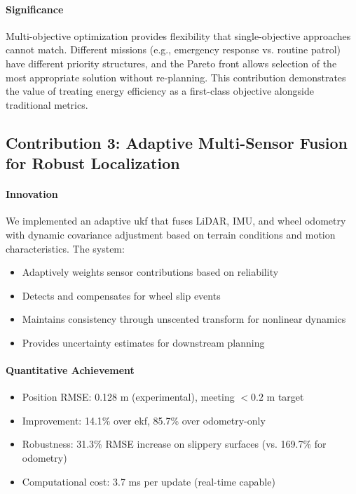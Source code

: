 \paragraph{Significance}
Multi-objective optimization provides flexibility that single-objective approaches cannot match. Different missions (e.g., emergency response vs. routine patrol) have different priority structures, and the Pareto front allows selection of the most appropriate solution without re-planning. This contribution demonstrates the value of treating energy efficiency as a first-class objective alongside traditional metrics.

\subsection{Contribution 3: Adaptive Multi-Sensor Fusion for Robust Localization}

\paragraph{Innovation}
We implemented an adaptive \acrshort{ukf} that fuses LiDAR, IMU, and wheel odometry with dynamic covariance adjustment based on terrain conditions and motion characteristics. The system:
\begin{itemize}
    \item Adaptively weights sensor contributions based on reliability
    \item Detects and compensates for wheel slip events
    \item Maintains consistency through unscented transform for nonlinear dynamics
    \item Provides uncertainty estimates for downstream planning
\end{itemize}

\paragraph{Quantitative Achievement}
\begin{itemize}
    \item Position RMSE: 0.128 m (experimental), meeting $< 0.2$ m target
    \item Improvement: 14.1\% over \acrshort{ekf}, 85.7\% over odometry-only
    \item Robustness: 31.3\% RMSE increase on slippery surfaces (vs. 169.7\% for odometry)
    \item Computational cost: 3.7 ms per update (real-time capable)
\end{itemize}

